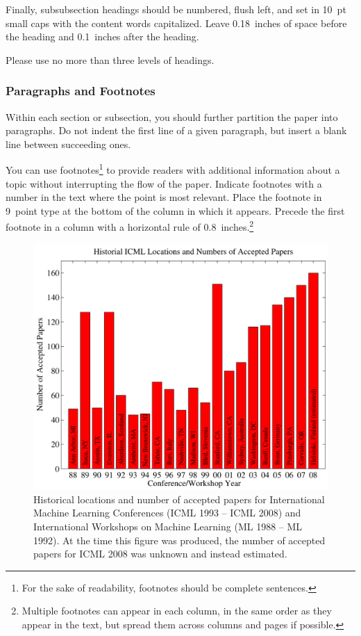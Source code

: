\documentclass{article}
\begin{document}
Finally, subsubsection headings should be numbered, flush left, and
set in 10~pt small caps with the content words capitalized. Leave
0.18~inches of space before the heading and 0.1~inches after the
heading. 

Please use no more than three levels of headings.

\subsubsection{Paragraphs and Footnotes}

Within each section or subsection, you should further partition the
paper into paragraphs. Do not indent the first line of a given
paragraph, but insert a blank line between succeeding ones.
 
You can use footnotes\footnote{For the sake of readability, footnotes
should be complete sentences.} to provide readers with additional
information about a topic without interrupting the flow of the paper. 
Indicate footnotes with a number in the text where the point is most
relevant. Place the footnote in 9~point type at the bottom of the
column in which it appears. Precede the first footnote in a column
with a horizontal rule of 0.8~inches.\footnote{Multiple footnotes can
appear in each column, in the same order as they appear in the text,
but spread them across columns and pages if possible.}

\begin{figure}[ht]
\vskip 0.2in
\begin{center}
\centerline{\includegraphics[width=\columnwidth]{icml_numpapers}}
\caption{Historical locations and number of accepted papers for International
  Machine Learning Conferences (ICML 1993 -- ICML 2008) and
  International Workshops on Machine Learning (ML 1988 -- ML
  1992). At the time this figure was produced, the number of
  accepted papers for ICML 2008 was unknown and instead estimated.}
\label{icml-historical}
\end{center}
\vskip -0.2in
\end{figure} 
\end{document}
